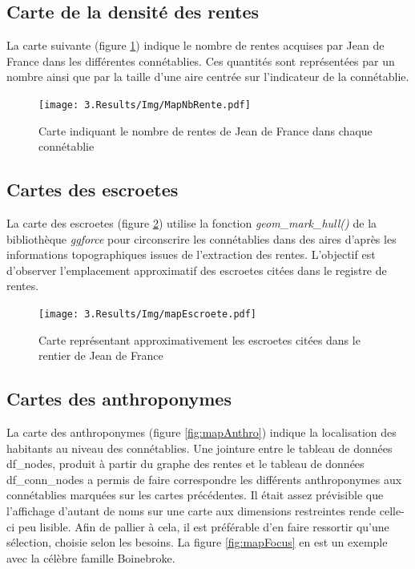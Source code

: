 \subsection{Carte de la densité des rentes }
La carte suivante (figure \ref{fig:mapNbRente}) indique le nombre de rentes acquises par Jean de France dans les différentes connétablies. Ces quantités sont représentées par un  nombre ainsi que par la taille  d'une aire centrée sur l'indicateur de la connétablie.
\begin{figure}
    \centering
    \texttt{[image: 3.Results/Img/MapNbRente.pdf]}
    \caption{Carte indiquant le nombre de rentes  de Jean de France dans chaque connétablie}
    \label{fig:mapNbRente}
\end{figure}


\subsection{Cartes des escroetes}
La carte  des escroetes (figure \ref{fig:mapEscroete})  utilise la fonction \textit{geom\_mark\_hull()} de la bibliothèque \textit{ggforce} pour circonscrire les connétablies dans des aires d'après les informations topographiques issues de l'extraction des rentes. L'objectif est d'observer l'emplacement approximatif des escroetes citées dans le registre de rentes.

\begin{figure}
    \centering
    \texttt{[image: 3.Results/Img/mapEscroete.pdf]}
    \caption{Carte représentant approximativement les escroetes citées dans le rentier de Jean de France}
    \label{fig:mapEscroete}
\end{figure}

\subsection{Cartes des anthroponymes}
La carte  des anthroponymes (figure \ref{fig:mapAnthro}) indique la localisation des habitants au niveau des connétablies.
Une jointure entre le tableau de données df\_nodes, produit à partir du graphe des rentes et le tableau de données df\_conn\_nodes  a permis de faire correspondre les différents anthroponymes aux connétablies marquées sur les cartes précédentes. Il était assez prévisible que l'affichage d'autant de noms  sur une carte aux dimensions restreintes rende celle-ci peu lisible. Afin de pallier à cela, il est préférable d'en faire ressortir qu'une sélection, choisie selon les besoins. La figure \ref{fig:mapFocus} en est un exemple avec la célèbre famille Boinebroke.


